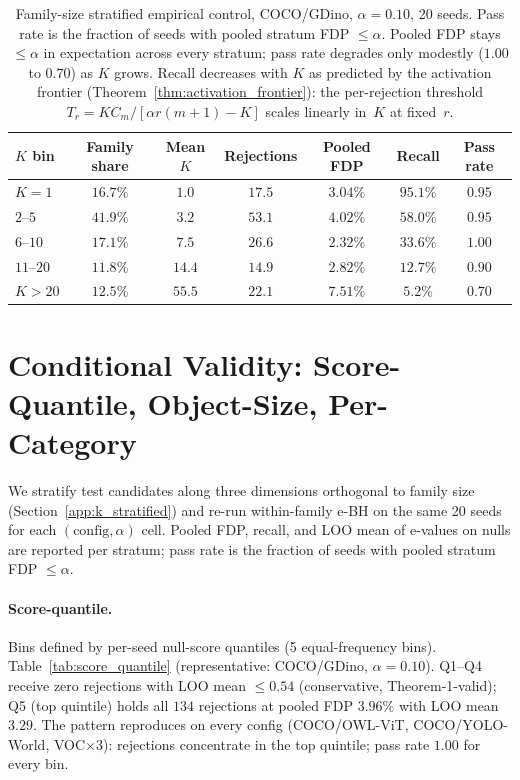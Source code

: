 \documentclass{article}
\theoremstyle{remark}
\newcommand{\1}{\mathbf{1}}
\begin{document}
\begin{table}[h]
\centering
\small
\begin{tabular*}{\linewidth}{@{\extracolsep{\fill}}lcccccc@{}}
\toprule
$K$ bin & Family share & Mean $K$ & Rejections & Pooled FDP & Recall & Pass rate \\
\midrule
$K\!=\!1$    & $16.7\%$ & $1.0$  & $17.5$ & $3.04\%$ & $95.1\%$ & $0.95$ \\
$2$--$5$     & $41.9\%$ & $3.2$  & $53.1$ & $4.02\%$ & $58.0\%$ & $0.95$ \\
$6$--$10$    & $17.1\%$ & $7.5$  & $26.6$ & $2.32\%$ & $33.6\%$ & $1.00$ \\
$11$--$20$   & $11.8\%$ & $14.4$ & $14.9$ & $2.82\%$ & $12.7\%$ & $0.90$ \\
$K\!>\!20$   & $12.5\%$ & $55.5$ & $22.1$ & $7.51\%$ & $5.2\%$  & $0.70$ \\
\bottomrule
\end{tabular*}
\caption{Family-size stratified empirical control, COCO/GDino,
$\alpha\!=\!0.10$, 20 seeds. Pass rate is the fraction of seeds with
pooled stratum FDP $\le\alpha$. Pooled FDP stays $\le\alpha$ in
expectation across every stratum; pass rate degrades only modestly
($1.00$ to $0.70$) as $K$ grows. Recall decreases with $K$ as
predicted by the activation frontier
(Theorem~\ref{thm:activation_frontier}): the per-rejection threshold
$T_r = K C_m / [\alpha r(m{+}1) - K]$ scales linearly in~$K$ at
fixed~$r$.}
\label{tab:k_stratified_main}
\end{table}

\section{Conditional Validity: Score-Quantile, Object-Size, Per-Category}
\label{app:conditional_validity}

We stratify test candidates along three dimensions orthogonal to
family size (Section~\ref{app:k_stratified}) and re-run within-family
e-BH on the same 20 seeds for each $(\textrm{config}, \alpha)$ cell.
Pooled FDP, recall, and LOO mean of e-values on nulls are reported
per stratum; pass rate is the fraction of seeds with pooled stratum
FDP $\le\alpha$.

\paragraph{Score-quantile.}
Bins defined by per-seed null-score quantiles (5 equal-frequency bins).
Table~\ref{tab:score_quantile} (representative: COCO/GDino,
$\alpha\!=\!0.10$). Q1--Q4 receive zero rejections with LOO mean
$\le 0.54$ (conservative, Theorem-1-valid); Q5 (top quintile) holds
all $134$ rejections at pooled FDP $3.96\%$ with LOO mean $3.29$.
The pattern reproduces on every config (COCO/OWL-ViT, COCO/YOLO-World,
VOC$\times$3): rejections concentrate in the top quintile;
pass rate $1.00$ for every bin.
\end{document}
